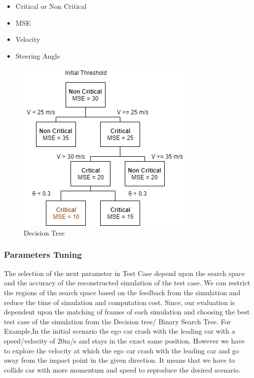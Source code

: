 \begin{itemize}
  \item	Critical or Non Critical
  \item	MSE
  \item	Velocity
  \item	Steering Angle
\end{itemize}


\begin{figure}[H]
\centering
  \includegraphics[scale = 0.4]{pictures/Decision_Tree.png}
  \caption{Decision Tree}
\end{figure}

\subsubsection{Parameters Tuning}
The selection of the next parameter in Test Case depend upon the search space and the accuracy of the reconstructed simulation of the test case. We can restrict the regions of the search space based on the feedback from the simulation and reduce the time of simulation and computation cost. Since, our evaluation is dependent upon the matching of frames of each simulation and choosing the best test case of the simulation from the Decision tree/ Binary Search Tree. For Example,In the initial scenario the ego car crash with the leading car with a speed/velocity of 20m/s and stays in the exact same position. However we have to explore the velocity at which the ego car crash with the leading car and go away from the impact point in the given direction. It means that we have to collide car with more momentum and speed to reproduce the desired scenario.